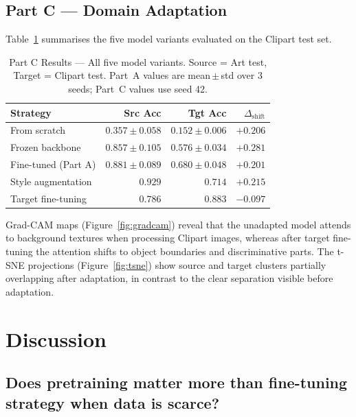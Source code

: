 \documentclass[conference]{IEEEtran}
\begin{document}
\subsection{Part C — Domain Adaptation}

Table~\ref{tab:partc} summarises the five model variants evaluated on the
Clipart test set.

\begin{table}[h]
\centering
\caption{Part C Results — All five model variants. Source = Art test, Target = Clipart test.
         Part~A values are mean\,$\pm$\,std over 3 seeds; Part~C values use seed 42.}
\label{tab:partc}
\begin{tabular}{lrrr}
\toprule
\textbf{Strategy} & \textbf{Src Acc} & \textbf{Tgt Acc} & \textbf{$\Delta_{\text{shift}}$} \\
\midrule
From scratch            & $0.357 \pm 0.058$ & $0.152 \pm 0.006$ & $+0.206$ \\
Frozen backbone         & $0.857 \pm 0.105$ & $0.576 \pm 0.034$ & $+0.281$ \\
Fine-tuned (Part A)     & $0.881 \pm 0.089$ & $0.680 \pm 0.048$ & $+0.201$ \\
Style augmentation      & $0.929$ & $0.714$ & $+0.215$ \\
Target fine-tuning      & $0.786$ & $\mathbf{0.883}$ & $\mathbf{-0.097}$ \\
\bottomrule
\end{tabular}
\end{table}

Grad-CAM maps (Figure~\ref{fig:gradcam}) reveal that the unadapted model attends
to background textures when processing Clipart images, whereas after target
fine-tuning the attention shifts to object boundaries and discriminative parts.
The t-SNE projections (Figure~\ref{fig:tsne}) show source and target clusters
partially overlapping after adaptation, in contrast to the clear separation
visible before adaptation.

\section{Discussion}
\label{sec:discussion}

\subsection{Does pretraining matter more than fine-tuning strategy when data is scarce?}
\end{document}
